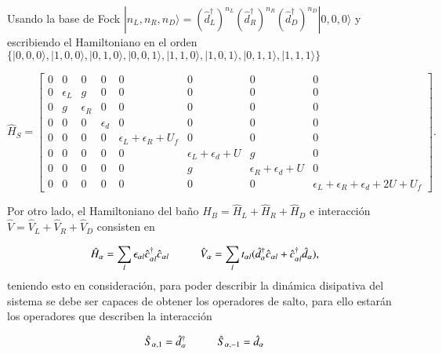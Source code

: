 Usando la base de Fock $|n_{L},n_{R},n_{D} \rangle = (\hat{d}^{\dagger}_{L})^{n_{L}}(\hat{d}^{\dagger}_{R})^{n_{R}}(\hat{d}^{\dagger}_{D})^{n_{D}}|0,0,0\rangle$ y escribiendo el Hamiltoniano en el orden 
$\{|0,0,0\rangle, |1,0,0\rangle, |0,1,0\rangle, |0,0,1\rangle, |1,1,0\rangle, |1,0,1\rangle, |0,1,1\rangle, |1,1,1\rangle\}$ 

\begin{equation*}
    \hat{H}_{S} = 
    \begin{bmatrix}
        0 & 0 & 0 & 0 & 0 & 0 & 0 & 0 \\
        0 & \epsilon_{L} & g & 0 & 0 & 0 & 0 & 0 \\
        0 & g & \epsilon_{R} & 0 & 0 & 0 & 0 & 0 \\
        0 & 0 & 0 & \epsilon_{d} & 0 & 0 & 0 & 0 \\
        0 & 0 & 0 & 0 & \epsilon_{L} + \epsilon_{R}  + U_{f} & 0 & 0 & 0 \\
        0 & 0 & 0 & 0 & 0 & \epsilon_{L} + \epsilon_{d} + U & g & 0 \\
        0 & 0 & 0 & 0 & 0 & g & \epsilon_{R} + \epsilon_{d} + U & 0 \\
        0 & 0 & 0 & 0 & 0 & 0 & 0 & \epsilon_{L} + \epsilon_{R}  + \epsilon_{d} + 2U + U_{f} 
        \end{bmatrix}.
\end{equation*}

Por otro lado, el Hamiltoniano del baño $\hat{H}_{B} = \hat{H}_{L} + \hat{H}_{R} + \hat{H}_{D}$ e interacción $\hat{V} = \hat{V}_{L} + \hat{V}_{R} + \hat{V}_{D}$ consisten en

\begin{equation*}
    \hat{H}_{\alpha} = \sum_{l} \epsilon_{\alpha l} \hat{c}^{\dagger}_{\alpha l}\hat{c}_{\alpha l} \hspace{10mm} \hat{V}_{\alpha} = \sum_{l} t_{\alpha l} ( \hat{d}^{\dagger}_{\alpha} \hat{c}_{\alpha l} + \hat{c}^{\dagger}_{\alpha l} \hat{d}_{\alpha} ),
\end{equation*}
teniendo esto en consideración, para poder describir la dinámica disipativa del sistema se debe ser capaces de obtener los operadores de salto, para ello estarán los operadores que describen la interacción

\begin{equation*}
    \hat{S}_{\alpha,1} = \hat{d}^{\dagger}_{\alpha} \hspace{10mm} \hat{S}_{\alpha,-1} = \hat{d}_{\alpha}
\end{equation*}

